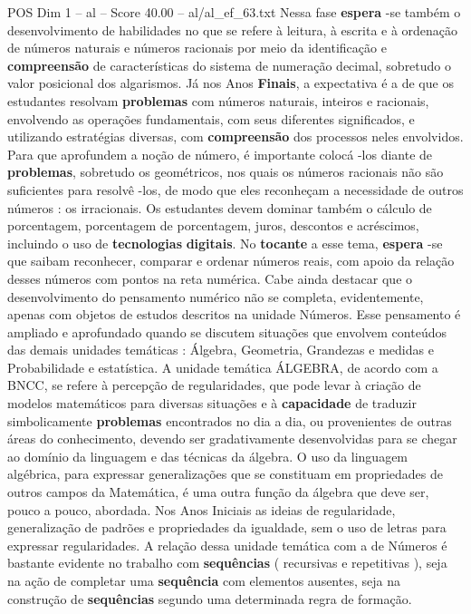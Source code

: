 \begin{textsample}{POS Dim 1 – al – Score 40.00 – al/al\_ef\_63.txt}
Nessa fase \textbf{espera} -se também o desenvolvimento de habilidades no que se refere à leitura, à escrita e à ordenação de números naturais e números racionais por meio da identificação e \textbf{compreensão} de características do sistema de numeração decimal, sobretudo o valor posicional dos algarismos.
Já nos Anos \textbf{Finais}, a expectativa é a de que os estudantes resolvam \textbf{problemas} com números naturais, inteiros e racionais, envolvendo as operações fundamentais, com seus diferentes significados, e utilizando estratégias diversas, com \textbf{compreensão} dos processos neles envolvidos.
Para que aprofundem a noção de número, é importante colocá -los diante de \textbf{problemas}, sobretudo os geométricos, nos quais os números racionais não são suficientes para resolvê -los, de modo que eles reconheçam a necessidade de outros números : os irracionais.
Os estudantes devem dominar também o cálculo de porcentagem, porcentagem de porcentagem, juros, descontos e acréscimos, incluindo o uso de \textbf{tecnologias} \textbf{digitais}.
No \textbf{tocante} a esse tema, \textbf{espera} -se que saibam reconhecer, comparar e ordenar números reais, com apoio da relação desses números com pontos na reta numérica.
Cabe ainda destacar que o desenvolvimento do pensamento numérico não se completa, evidentemente, apenas com objetos de estudos descritos na unidade Números.
Esse pensamento é ampliado e aprofundado quando se discutem situações que envolvem conteúdos das demais unidades temáticas : Álgebra, Geometria, Grandezas e medidas e Probabilidade e estatística.
A unidade temática ÁLGEBRA, de acordo com a BNCC, se refere à percepção de regularidades, que pode levar à criação de modelos matemáticos para diversas situações e à \textbf{capacidade} de traduzir simbolicamente \textbf{problemas} encontrados no dia a dia, ou provenientes de outras áreas do conhecimento, devendo ser gradativamente desenvolvidas para se chegar ao domínio da linguagem e das técnicas da álgebra.
O uso da linguagem algébrica, para expressar generalizações que se constituam em propriedades de outros campos da Matemática, é uma outra função da álgebra que deve ser, pouco a pouco, abordada.
Nos Anos Iniciais as ideias de regularidade, generalização de padrões e propriedades da igualdade, sem o uso de letras para expressar regularidades.
A relação dessa unidade temática com a de Números é bastante evidente no trabalho com \textbf{sequências} ( recursivas e repetitivas ), seja na ação de completar uma \textbf{sequência} com elementos ausentes, seja na construção de \textbf{sequências} segundo uma determinada regra de formação.

\end{textsample}
